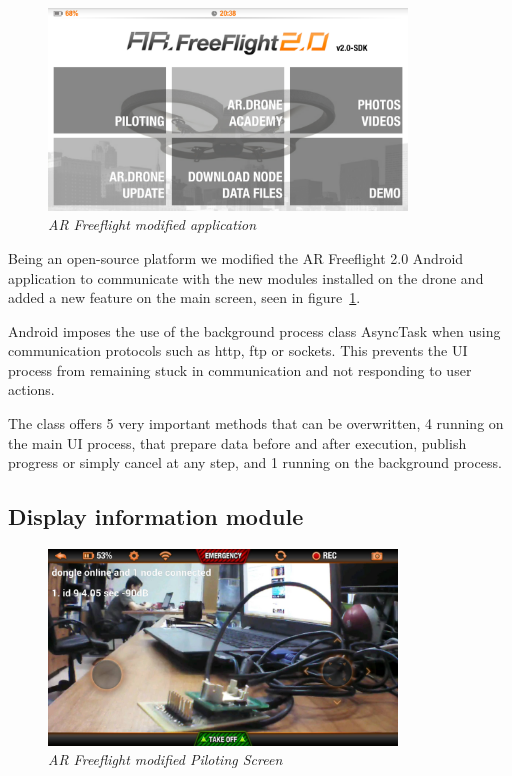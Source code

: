 \begin{figure}[ht]
\begin{center}
\includegraphics[width=0.85\textwidth]{img/android_app.png}
\end{center}
\caption{\small \itshape{AR Freeflight modified application}}
  \label{fig:moded_app}
\end{figure}

Being an open-source platform we modified the AR Freeflight 2.0 Android application to communicate with the new modules installed on the drone and added a new feature on the main screen, seen in figure~\ref{fig:moded_app}.

Android imposes the use of the background process class AsyncTask when using communication protocols such as http, ftp or sockets. This prevents the UI process from remaining stuck in communication and not responding to user actions.

The class offers 5 very important methods that can be overwritten, 4 running on the main UI process, that prepare data before and after execution, publish progress or simply cancel at any step, and 1 running on the background process.

\subsection{Display information module}
 
\begin{figure}[ht]
\begin{center}
\includegraphics[width=0.825\textwidth]{img/android_info.png}
\end{center}
\caption{\small \itshape{AR Freeflight modified Piloting Screen}}
  \label{fig:pilot}
\end{figure}

